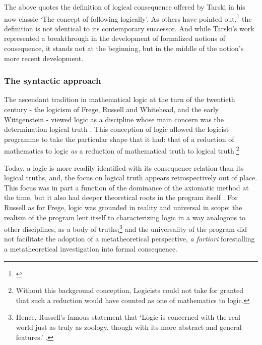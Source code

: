 	The above quotes the definition of logical consequence offered by Tarski in his now classic `The concept of following logically'. As others have pointed out,\footnote{\cite{Hodges1986} \cite{Etchemendy1988} \cite{Etchemendy2008} \cite{Sher1991}} the definition is not identical to its contemporary successor. And while Tarski's work represented a breakthrough in the development of formalized notions of consequence, it stands not at the beginning, but in the middle of the notion's more recent development.
	\subsubsection{The syntactic approach}
	The ascendant tradition in mathematical logic at the turn of the twentieth century - the logicism of Frege, Russell and Whitehead, and the early Wittgenstein - viewed logic as a discipline whose main concern was the determination logical truth \cite[pp. 74-77]{Etchemendy1988}. This conception of logic allowed the logicist programme to take the particular shape that it had: that of a reduction of mathematics to logic \textit{as} a reduction of mathematical truth to logical truth.\footnote{Without this background conception, Logicists could not take for granted that such a reduction would have counted as one of mathematics to logic.}
	
	Today, a logic is more readily identified with its consequence relation than its logical truths, and, the focus on logical truth appears retrospectively out of place. This focus was in part a function of the dominance of the axiomatic method at the time, but it also had deeper theoretical roots in the program itself \cite{vanHeijenoort1967}. For Russell as for Frege, logic was grounded in reality and universal in scope: the realism of the program lent itself to characterizing logic in a way analogous to other disciplines, as a body of truths;\footnote{Hence, Russell's famous statement that `Logic is concerned with the real world just as truly as zoology, though with its more abstract and general features.' \cite[p. 169]{Russell1919}.} and the universality of the program did not facilitate the adoption of a metatheoretical perspective, \textit{a fortiori} forestalling a metatheoretical investigation into formal consequence. 
		
